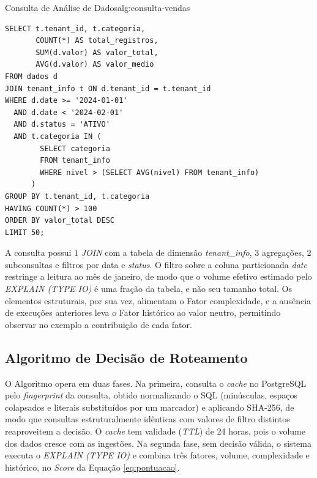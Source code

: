 \begin{blocoalgoritmo}{Consulta de Análise de Dados}{alg:consulta-vendas}
\begin{framed}
\begin{lstlisting}[style=sqlmoldura]
SELECT t.tenant_id, t.categoria,
       COUNT(*) AS total_registros,
       SUM(d.valor) AS valor_total,
       AVG(d.valor) AS valor_medio
FROM dados d
JOIN tenant_info t ON d.tenant_id = t.tenant_id
WHERE d.date >= '2024-01-01'
  AND d.date < '2024-02-01'
  AND d.status = 'ATIVO'
  AND t.categoria IN (
        SELECT categoria
        FROM tenant_info
        WHERE nivel > (SELECT AVG(nivel) FROM tenant_info)
      )
GROUP BY t.tenant_id, t.categoria
HAVING COUNT(*) > 100
ORDER BY valor_total DESC
LIMIT 50;
\end{lstlisting}
\end{framed}

\end{blocoalgoritmo}

A consulta possui 1 \textit{JOIN} com a tabela de dimensão \textit{tenant\_info}, 3 agregações, 2 subconsultas e filtros por data e \textit{status}. O filtro sobre a coluna particionada \textit{date} restringe a leitura ao mês de janeiro, de modo que o volume efetivo estimado pelo \textit{EXPLAIN (TYPE IO)} é uma fração da tabela, e não seu tamanho total. Os elementos estruturais, por sua vez, alimentam o Fator complexidade, e a ausência de execuções anteriores leva o Fator histórico ao valor neutro, permitindo observar no exemplo a contribuição de cada fator.

\subsection{Algoritmo de Decisão de Roteamento}
\label{sec:algoritmo-decisao}

O Algoritmo opera em duas fases. Na primeira, consulta o \textit{cache} no PostgreSQL pelo \textit{fingerprint} da consulta, obtido normalizando o SQL (minúsculas, espaços colapsados e literais substituídos por um marcador) e aplicando SHA-256, de modo que consultas estruturalmente idênticas com valores de filtro distintos reaproveitem a decisão. O \textit{cache} tem validade (\textit{TTL}) de 24 horas, pois o volume dos dados cresce com as ingestões. Na segunda fase, sem decisão válida, o sistema executa o \textit{EXPLAIN (TYPE IO)} e combina três fatores, volume, complexidade e histórico, no \textit{Score} da Equação \ref{eq:pontuacao}.

